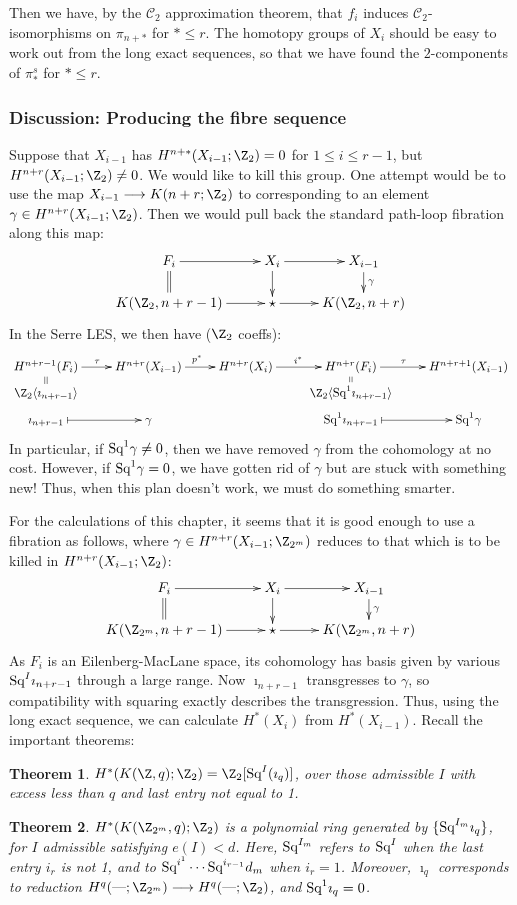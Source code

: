 \documentclass[11pt]{article}
\newcommand{\Squ}{\textup{Sq}}
\newcommand{\DASH}{\textup{---}}
\theoremstyle{plain}
\newtheorem*{thm*}{Theorem}
\theoremstyle{definition}
\renewcommand{\to}{\longrightarrow}
\newcommand{\SerreClass}{\mathscr{C}}
\begin{document}
Then we have, by the $\SerreClass_2$ approximation theorem, that $f_i$ induces 
$\SerreClass_2$-isomorphisms on $\pi_{n+*}$ for $*\leq r$. The homotopy groups
of $X_i$ should be easy to work out from the long exact sequences, so that we
have found the $2$-components of $\pi_*^s$ for $*\leq r$.

\subsubsection{Discussion: Producing the fibre sequence}
Suppose that $X_{i-1}$ has $H^{n+*}(X_{i-1};\Z_2)=0$ for $1\leq i\leq r-1$, but
 $H^{n+r}(X_{i-1};\Z_2)\neq0$. We would like to kill this group. One attempt
would be to use the map $X_{i-1}\to K(n+r;\Z_2)$ to corresponding to an element
$\gamma\in H^{n+r}(X_{i-1};\Z_2)$. Then we would pull back the standard
path-loop fibration along this map:
\[\xymatrix@R=5mm{
F_i\ar[r]\ar@{=}[d]&
X_i\ar[d]\ar[r]&
X_{i-1}\ar[d]^\gamma\\
K(\Z_2,n+r-1)\ar[r]&\star\ar[r]&K(\Z_2,n+r)
}\]
In the Serre LES, we then have ($\Z_2$ coeffs):
\[\xymatrix@R=1.5mm{
H^{n+r-1}(F_i)\ar@{->}[r]^{\tau}&
H^{n+r}(X_{i-1})\ar[r]^{p^*}&
H^{n+r}(X_i)\ar[r]^{i^*}&
H^{n+r}(F_i)\ar@{->}[r]^{\tau\ \ \ }&%
H^{n+r+1}(X_{i-1})\\
\Z_2\langle\imath_{n+r-1}\rangle\ar@{=}[u]&
&&
\Z_2\langle\Squ^1\imath_{n+r-1}\rangle\ar@{=}[u]\\
\imath_{n+r-1}\ar@{|->}[r]&\gamma&&
\Squ^1\imath_{n+r-1}\ar@{|->}[r]&\Squ^1\gamma
}\]
In particular, if $\Squ^1\gamma\neq0$, then we have removed $\gamma$ from the 
cohomology at no cost. However, if $\Squ^1\gamma=0$, we have gotten rid of 
$\gamma$ but are stuck with something new! Thus, when this plan doesn't work, 
we must do something smarter.

For the calculations of this chapter, it seems that it is good enough to use a
fibration as follows, where $\gamma\in H^{n+r}(X_{i-1};\Z_{2^m})$ reduces to that
which is to be killed in $H^{n+r}(X_{i-1};\Z_2)$:
\[\xymatrix@R=5mm{
F_i\ar[r]\ar@{=}[d]&
X_i\ar[d]\ar[r]&
X_{i-1}\ar[d]^\gamma\\
K(\Z_{2^m},n+r-1)\ar[r]&\star\ar[r]&K(\Z_{2^m},n+r)
}\]
As $F_i$ is an Eilenberg-MacLane space, its cohomology has basis given by 
various $\Squ^I\imath_{n+r-1}$ through a large range.
Now $\imath_{n+r-1}$ transgresses to $\gamma$, so compatibility with squaring
exactly describes the transgression.
Thus, using the long exact sequence, we can calculate $H^*(X_i)$ from 
$H^*(X_{i-1})$.
Recall the important theorems:
\begin{thm*}$H^*(K(\Z,q);\Z_2)=\Z_2[\Squ^I(\imath_q)]$, over those admissible $I$
 with excess less than $q$ and last entry not equal to 1.
\end{thm*}
\begin{thm*}
$H^*(K(\Z_{2^m},q);\Z_2)$ is a polynomial ring generated by
$\{\Squ^{I_m}\imath_q\}$, for $I$ admissible satisfying $e(I)<d$. Here,
$\Squ^{I_m}$ refers to $\Squ^I$ when the last entry $i_r$ is not 1, and to
$\Squ^{i^1}\cdots \Squ^{i_{r-1}}d_m$ when $i_r=1$. Moreover, $\imath_q$ corresponds
to reduction $H^q(\DASH;\Z_{2^m})\to H^q(\DASH;\Z_{2})$, and $\Squ^1\imath_q=0$.
\end{thm*}
\end{document}
